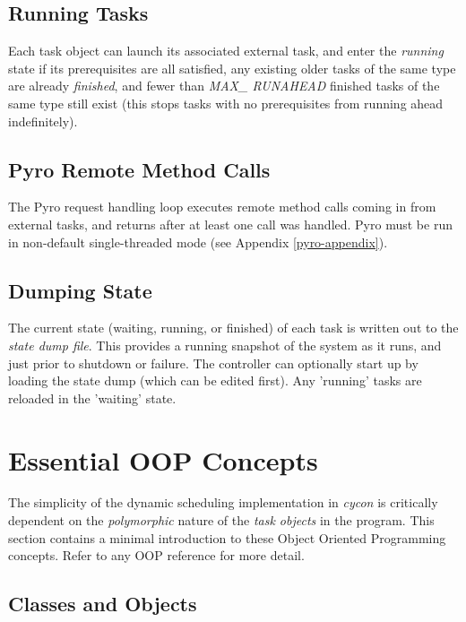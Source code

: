 \documentclass[11pt,a4paper]{article}
\begin{document}
\subsection{Running Tasks}

Each task object can launch its associated external task, and enter the
{\em running} state if its prerequisites are all satisfied, any existing
older tasks of the same type are already {\em finished}, and fewer than
{\em MAX\_ RUNAHEAD} finished tasks of the same type still exist (this
stops tasks with no prerequisites from running ahead indefinitely).

\subsection{Pyro Remote Method Calls}

The Pyro request handling loop executes remote method calls coming in
from external tasks, and returns after at least one call was handled.
Pyro must be run in non-default single-threaded mode (see Appendix
\ref{pyro-appendix}).

\subsection{Dumping State} 

The current state (waiting, running, or finished) of each task is
written out to the {\em state dump file}.  This provides a running
snapshot of the system as it runs, and just prior to shutdown or
failure. The controller can optionally start up by loading the state
dump (which can be edited first). Any 'running' tasks are reloaded in
the 'waiting' state.

\appendix

\section{Essential OOP Concepts}

The simplicity of the dynamic scheduling implementation in {\em cycon}
is critically dependent on the {\em polymorphic} nature of the {\em task
objects} in the program.  This section contains a minimal introduction
to these Object Oriented Programming concepts.  Refer to any OOP
reference for more detail.

\subsection{Classes and Objects}
\end{document}
